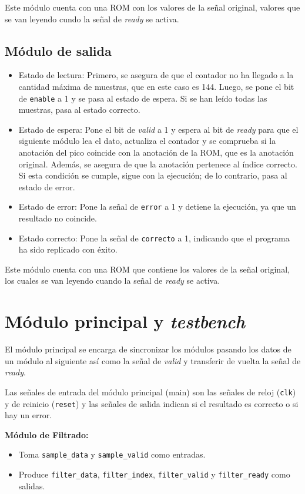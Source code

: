 Este módulo cuenta con una ROM con los valores de la señal original, valores que se van leyendo cundo la señal de \textit{ready} se activa.

\subsection{Módulo de salida}
\begin{itemize}
\item Estado de lectura: Primero, se asegura de que el contador no ha llegado a la cantidad máxima de muestras, que en este caso es 144. Luego, se pone el bit de \texttt{enable} a 1 y se pasa al estado de espera. Si se han leído todas las muestras, pasa al estado correcto.
\item Estado de espera: Pone el bit de \textit{valid} a 1 y espera al bit de \textit{ready} para que el siguiente módulo lea el dato, actualiza el contador y se comprueba si la anotación del pico coincide con la anotación de la ROM, que es la anotación original. Además, se asegura de que la anotación pertenece al índice correcto. Si esta condición se cumple, sigue con la ejecución; de lo contrario, pasa al estado de error.
\item Estado de error: Pone la señal de \texttt{error} a 1 y detiene la ejecución, ya que un resultado no coincide.
\item Estado correcto: Pone la señal de \texttt{correcto} a 1, indicando que el programa ha sido replicado con éxito.
\end{itemize}

Este módulo cuenta con una ROM que contiene los valores de la señal original, los cuales se van leyendo cuando la señal de \textit{ready} se activa.
\section{Módulo principal y \textit{testbench}}

El módulo principal se encarga de sincronizar los módulos pasando los datos de un módulo al siguiente así como la señal de \textit{valid} y transferir de vuelta la señal de \textit{ready}.

Las señales de entrada del módulo principal (main) son las señales de reloj (\texttt{clk}) y de reinicio (\texttt{reset}) y las señales de salida indican si el resultado es correcto o si hay un error.

\textbf{Módulo de Filtrado:}
\begin{itemize}
    \item Toma \texttt{sample\_data} y \texttt{sample\_valid} como entradas.
    \item Produce \texttt{filter\_data}, \texttt{filter\_index}, \texttt{filter\_valid} y \texttt{filter\_ready} como salidas.
\end{itemize}

